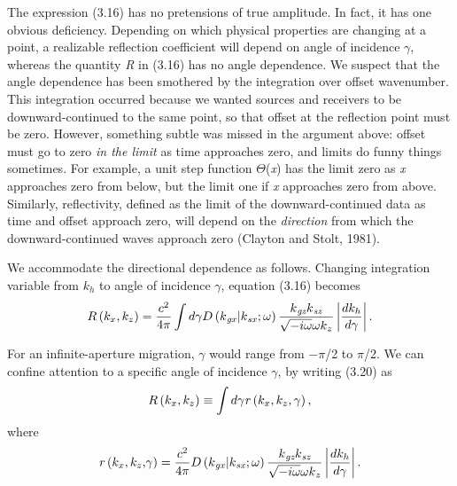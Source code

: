 The expression (3.16) has no pretensions of true amplitude. In fact, it has one obvious deficiency. Depending on which physical properties
are changing at a point, a realizable reflection coefficient will depend on angle of incidence $\gamma $, whereas the quantity \textit{R} in (3.16)
has no angle dependence. We suspect that the angle dependence has been smothered by the integration over offset wavenumber. This integration
occurred because we wanted sources and receivers to be downward-continued to the same point, so that offset at the reflection point must be zero.
However, something subtle was missed in the argument above: offset must go to zero \textit{in the limit} as time approaches zero, and limits
do funny things sometimes. For example, a unit step function $\Theta $(\textit{x}) has the limit zero as \textit{x} approaches zero from below,
but the limit one if \textit{x} approaches zero from above. Similarly, reflectivity, defined as the limit of the downward-continued data as time
and offset approach zero, will depend on the \textit{direction} from which the downward-continued waves approach zero (Clayton and Stolt, 1981).

We accommodate the directional dependence as follows. Changing integration variable from \(k_h\) to angle of incidence $\gamma $, equation (3.16) becomes
\begin{equation}\text{\textit{$R$}}\left(\text{\textit{$k_x$}},\text{\textit{$k_z$}}\right) =\frac{\text{\textit{$c$}}^2}{4\pi } \int d\gamma \text{\textit{$D$}}\left(\text{\textit{$k$}}_{\text{\textit{gx}}}|\text{\textit{$k$}}_{\text{\textit{sx}}};\omega
\right)\frac{\text{\textit{$k$}}_{\textit{gz}}\text{\textit{$k$}}_{\textit{sz}}}{\sqrt{-i \omega } \omega  \text{\textit{$k$}}_z}\left|\frac{d\text{\textit{$k_h$}}}{d\gamma
}\right|.\end{equation}

For an infinite-aperture migration, $\gamma$ would range from $-\pi $/2 to $\pi $/2. We can confine attention to a specific angle of incidence $\gamma$, by writing (3.20) as
\begin{equation}\text{\textit{$R$}}\left(\text{\textit{$k_x$}},\text{\textit{$k_z$}}\right) \equiv  \int d\gamma \text{\textit{$\mathit{r}$}}\left(\text{\textit{$k_x$}},\text{\textit{$k_z$}},\gamma
\right),\end{equation}
where
\begin{equation}\text{\textit{$\mathit{r}$}}\left(\text{\textit{$k_x$}},\text{\textit{$k_z$}}\text{\textit{$,$}}\gamma \right) =\frac{\text{\textit{$c$}}^2}{4\pi
} \text{\textit{$D$}}\left(\text{\textit{$k$}}_{\text{\textit{gx}}}|\text{\textit{$k$}}_{\text{\textit{sx}}};\omega \right) \frac{\text{\textit{$k$}}_{\textit{gz}}\text{\textit{$k$}}_{\textit{sz}}}{\sqrt{-i
\omega } \omega  \text{\textit{$k$}}_z}\left|\frac{d\text{\textit{$k_h$}}}{d\gamma }\right|.\end{equation}

